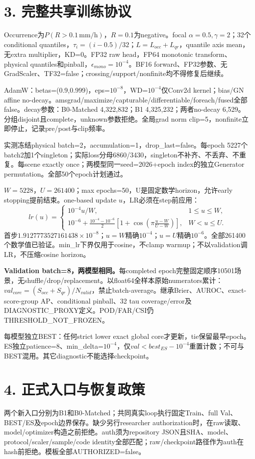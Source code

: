\documentclass[10pt,a4paper,fontset=windows]{ctexart}
\begin{document}
\section*{3. 完整共享训练协议}
Occurrence为$P(R>0.1\,\mathrm{mm/h})$，$R=0.1$为negative。focal $\alpha=0.5,\gamma=2$；32个conditional quantiles，$\tau_i=(i-0.5)/32$；$L=L_{occ}+L_{qr}$，quantile axis mean，无extra multiplier，KD=0。FP32 raw head，FP64 monotonic transform、physical quantiles和pinball，$\epsilon_{mono}=10^{-4}$。BF16 forward、FP32参数、无GradScaler、TF32=false；crossing/support/nonfinite均不得修复后继续。

AdamW：betas=(0.9,0.999)，eps=$10^{-8}$，WD=$10^{-4}$仅Conv2d kernel；bias/GN affine no-decay。amsgrad/maximize/capturable/differentiable/foreach/fused全部false。decay参数：B0-Matched 4,322,832；B1 4,325,232；两者no-decay 6,529。分组disjoint且complete，unknown参数拒绝。全局grad norm clip=5，nonfinite立即停止，记录pre/post与clip频率。

实测冻结physical batch=2，accumulation=1，drop\_last=false。每epoch 5227个batch2加1个singleton；实际loss分母6860/3430，singleton不补齐、不丢弃、不重复。每scene exactly once；两模型同一seed=2026+epoch index的独立Generator permutation。全部50个epoch计划通过。

$W=5228$，$U=261400$；max epochs=50，U是固定数学horizon，允许early stopping提前结束。one-based update $u$，LR必须在step前应用：
\[
lr(u)=\begin{cases}
10^{-4}u/W,&1\le u\le W,\\
10^{-6}+\frac{10^{-4}-10^{-6}}2\left[1+\cos\!\left(\pi\frac{u-W}{U-W}\right)\right],&W<u\le U.
\end{cases}
\]
首步$1.9127773527161438\times10^{-8}$；$u=W$精确$10^{-4}$；$u=U$精确$10^{-6}$。全部261400个数学值已验证。min\_lr下界仅用于cosine，不clamp warmup；不以validation调LR，不压缩cosine horizon。

\textbf{Validation batch=8，两模型相同。}每completed epoch完整固定顺序10501场景，无shuffle/drop/replacement。以float64全样本原始numerators累计：$val_{core}=(S_{occ}+S_{qr})/N_{valid}$，禁止batch-average。继承Brier、AUROC、exact-score-group AP、conditional pinball、32 tau coverage/error及DIAGNOSTIC\_PROXY定义。POD/FAR/CSI仍THRESHOLD\_NOT\_FROZEN。

每模型独立BEST：任何strict lower exact global core才更新，tie保留最早epoch。ES独立patience=8、min\_delta=$10^{-4}$，仅$val<best_{ES}-10^{-4}$重置计数；不可与BEST混用。其它diagnostic不能选择checkpoint。

\section*{4. 正式入口与恢复政策}
两个新入口分别为B1和B0-Matched；共同真实loop执行固定Train、full Val、BEST/ES及epoch边界保存。缺少另行researcher authorization时，在raw读取、model/optimizer构造之前拒绝。auth须为repository JSON且SHA、model、protocol/scaler/sample/code identity全部匹配；raw/checkpoint路径作为auth在hash前拒绝。模板全部AUTHORIZED=false。
\end{document}
